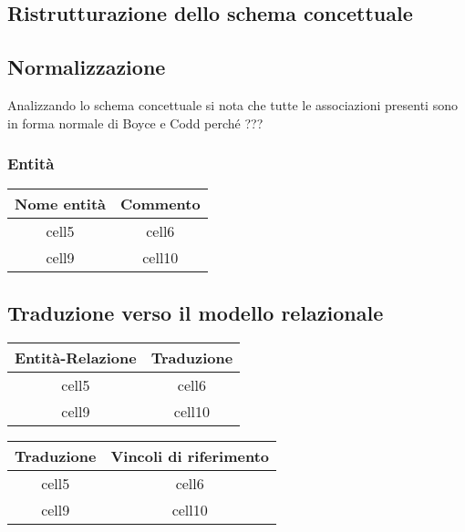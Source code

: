 \documentclass{article}
\begin{document}
\subsection{Ristrutturazione dello schema concettuale}

\subsection{Normalizzazione}
Analizzando lo schema concettuale si nota che tutte le associazioni presenti
sono in forma normale di Boyce e Codd perché ???

\subsubsection{Entità}

\begin{center}\begin{tabular}{ |c|c| }
		\hline
		\textbf{Nome entità} & \textbf{Commento} \\
		\hline
		cell5                & cell6             \\
		\hline
		cell9                & cell10            \\
		\hline
	\end{tabular}\end{center}

\subsection{Traduzione verso il modello relazionale}

\begin{center}\begin{tabular}{ |c|c| }
		\hline
		\textbf{Entità-Relazione} & \textbf{Traduzione} \\
		\hline
		cell5                     & cell6               \\
		\hline
		cell9                     & cell10              \\
		\hline
	\end{tabular}\end{center}

\begin{center}\begin{tabular}{ |c|c| }
		\hline
		\textbf{Traduzione} & \textbf{Vincoli di riferimento} \\
		\hline
		cell5               & cell6                           \\
		\hline
		cell9               & cell10                          \\
		\hline
	\end{tabular}\end{center}
\end{document}
